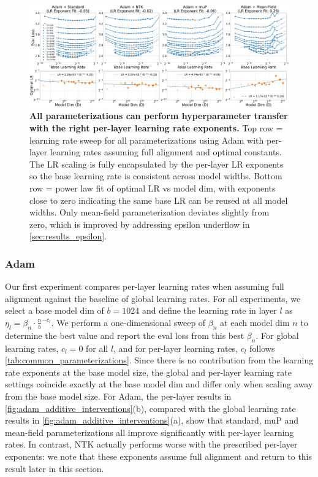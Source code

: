 \documentclass{article}
\theoremstyle{plain}
\theoremstyle{definition}
\theoremstyle{remark}
\begin{document}
\begin{figure}[ht]
    \centering
    \includegraphics[width=\textwidth]{icml2024/figures/per_layer_lr/lr_sweep_main_text.pdf}
    \vspace{2pt}
    \caption{\textbf{All parameterizations can perform hyperparameter transfer with the right per-layer learning rate exponents.} Top row = learning rate sweep for all parameterizations using Adam with per-layer learning rates assuming full alignment and optimal constants. The LR scaling is fully encapsulated by the per-layer LR exponents so the base learning rate is consistent across model widths. Bottom row = power law fit of optimal LR vs model dim, with exponents close to zero indicating the same base LR can be reused at all model widths. Only mean-field parameterization deviates slightly from zero, which is improved by addressing epsilon underflow in \cref{sec:results_epsilon}.}
    \label{fig:adam_hyperparameter_transfer}
\end{figure}

\subsubsection{Adam}

Our first experiment compares per-layer learning rates when assuming full alignment against the baseline of global learning rates. For all experiments, we select a base model dim of $b = 1024$ and define the learning rate in layer $l$ as $\eta_l = \beta_n \cdot \frac{n}{b} ^ {-c_l}$. We perform a one-dimensional sweep of $\beta_n$ at each model dim $n$ to determine the best value and report the eval loss from this best $\beta_n$. For global learning rates, $c_l = 0$ for all $l$, and for per-layer learning rates, $c_l$ follows \cref{tab:common_parameterizations}. Since there is no contribution from the learning rate exponents at the base model size, the global and per-layer learning rate settings coincide exactly at the base model dim and differ only when scaling away from the base model size. For Adam, the per-layer results in \cref{fig:adam_additive_interventions}(b), compared with the global learning rate results in \cref{fig:adam_additive_interventions}(a), show that standard, muP and mean-field parameterizations all improve significantly with per-layer learning rates. In contrast, NTK actually performs worse with the prescribed per-layer exponents: we note that these exponents assume full alignment and return to this result later in this section.
\end{document}
